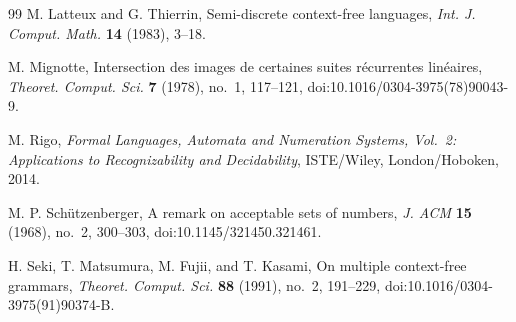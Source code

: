 \begin{thebibliography}{99}
M. Latteux and G. Thierrin,
Semi-discrete context-free languages,
\textit{Int. J. Comput. Math.} \textbf{14} (1983), 3--18.

M. Mignotte,
Intersection des images de certaines suites r\'ecurrentes lin\'eaires,
\textit{Theoret. Comput. Sci.} \textbf{7} (1978), no.~1, 117--121,
doi:10.1016/0304-3975(78)90043-9.

M. Rigo,
\textit{Formal Languages, Automata and Numeration Systems, Vol.~2:
Applications to Recognizability and Decidability},
ISTE/Wiley, London/Hoboken, 2014.

M. P. Sch\"utzenberger,
A remark on acceptable sets of numbers,
\textit{J. ACM} \textbf{15} (1968), no.~2, 300--303,
doi:10.1145/321450.321461.

H. Seki, T. Matsumura, M. Fujii, and T. Kasami,
On multiple context-free grammars,
\textit{Theoret. Comput. Sci.} \textbf{88} (1991), no.~2, 191--229,
doi:10.1016/0304-3975(91)90374-B.

\end{thebibliography}
